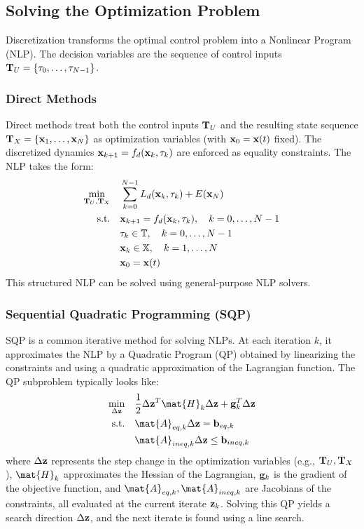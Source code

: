 \subsection{Solving the Optimization Problem}
Discretization transforms the optimal control problem into a Nonlinear Program (NLP). The decision variables are the sequence of control inputs $\mathbf{T}_U = \{\mathbf{\tau}_0, \dots, \mathbf{\tau}_{N-1}\}$.

\subsubsection{Direct Methods}
Direct methods treat both the control inputs $\mathbf{T}_U$ and the resulting state sequence $\mathbf{T}_X = \{\mathbf{x}_1, \dots, \mathbf{x}_N\}$ as optimization variables (with $\mathbf{x}_0 = \mathbf{x}(t)$ fixed). The discretized dynamics $ \mathbf{x}_{k+1} = f_d(\mathbf{x}_k, \mathbf{\tau}_k) $ are enforced as equality constraints. The NLP takes the form:
\begin{equation}
\begin{aligned}
\min_{\mathbf{T}_U, \mathbf{T}_X} \quad & \sum_{k=0}^{N-1} L_d(\mathbf{x}_k, \mathbf{\tau}_k) + E(\mathbf{x}_N) \\
\text{s.t.} \quad & \mathbf{x}_{k+1} = f_d(\mathbf{x}_k, \mathbf{\tau}_k), \quad k=0, \dots, N-1 \\
& \mathbf{\tau}_k \in \mathbb{T}, \quad k=0, \dots, N-1 \\
& \mathbf{x}_k \in \mathbb{X}, \quad k=1, \dots, N \\
& \mathbf{x}_0 = \mathbf{x}(t)
\end{aligned}
\end{equation}
This structured NLP can be solved using general-purpose NLP solvers.

\subsubsection{Sequential Quadratic Programming (SQP)}
SQP is a common iterative method for solving NLPs. At each iteration $k$, it approximates the NLP by a Quadratic Program (QP) obtained by linearizing the constraints and using a quadratic approximation of the Lagrangian function. The QP subproblem typically looks like:
\begin{equation}
\begin{aligned}
\min_{\Delta\vect{z}} \quad & \frac{1}{2}\Delta\vect{z}^T \mat{H}_k \Delta\vect{z} + \vect{g}_k^T \Delta\vect{z} \\
\text{s.t.} \quad & \mat{A}_{eq,k} \Delta\vect{z} = \vect{b}_{eq,k} \\
& \mat{A}_{ineq,k} \Delta\vect{z} \leq \vect{b}_{ineq,k}
\end{aligned}
\end{equation}
where $\Delta\mathbf{z}$ represents the step change in the optimization variables (e.g., $\mathbf{T}_U, \mathbf{T}_X$), $\mat{H}_k$ approximates the Hessian of the Lagrangian, $\mathbf{g}_k$ is the gradient of the objective function, and $\mat{A}_{eq,k}, \mat{A}_{ineq,k}$ are Jacobians of the constraints, all evaluated at the current iterate $\mathbf{z}_k$. Solving this QP yields a search direction $\Delta\mathbf{z}$, and the next iterate is found using a line search.

